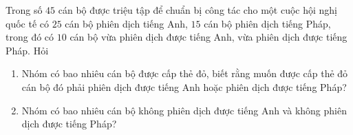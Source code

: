 \begin{bt}%
	Trong số $45$ cán bộ được triệu tập để chuẩn bị công tác cho một cuộc hội nghị quốc tế có $25$ cán bộ phiên dịch tiếng Anh, $15$ cán bộ phiên dịch tiếng Pháp, trong đó có $10$ cán bộ vừa phiên dịch được tiếng Anh, vừa phiên dịch được tiếng Pháp. Hỏi
	\begin{enumerate}
		\item Nhóm có bao nhiêu cán bộ được cấp thẻ đỏ, biết rằng muốn được cấp thẻ đỏ cán bộ đó phải phiên dịch được tiếng Anh hoặc phiên dịch được tiếng Pháp?
		\item Nhóm có bao nhiêu cán bộ không phiên dịch được tiếng Anh và không phiên dịch được tiếng Pháp?
	\end{enumerate}
\end{bt}

